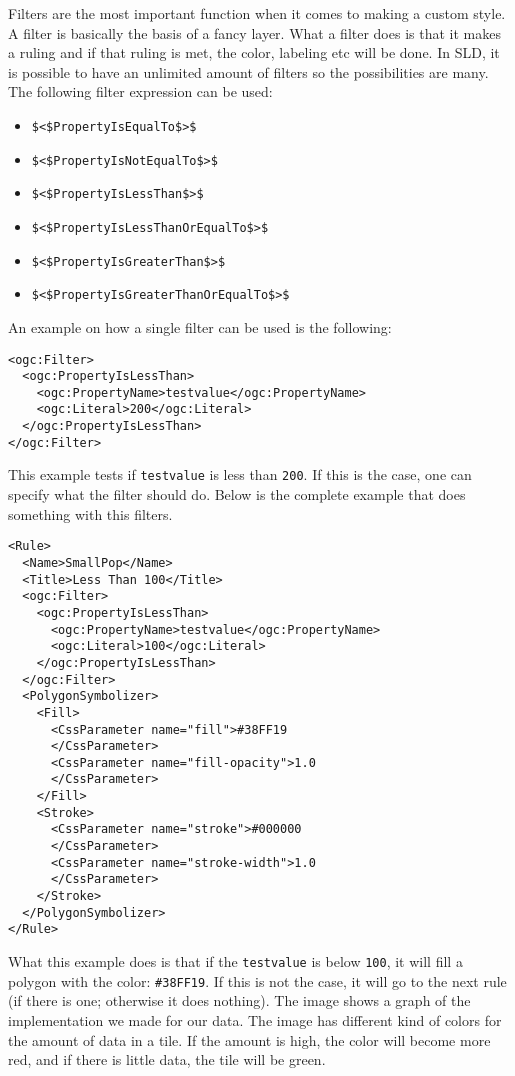 Filters are the most important function when it comes to making a custom
style. A filter is basically the basis of a fancy layer. What a filter does
is that it makes a ruling and if that ruling is met, the color, labeling
etc will be done. In SLD, it is possible to have an unlimited amount of
filters so the possibilities are many. The following filter expression
can be used:

\begin{itemize}
	\item \lstinline|$<$PropertyIsEqualTo$>$|
	\item \lstinline|$<$PropertyIsNotEqualTo$>$|
	\item \lstinline|$<$PropertyIsLessThan$>$|
	\item \lstinline|$<$PropertyIsLessThanOrEqualTo$>$|
	\item \lstinline|$<$PropertyIsGreaterThan$>$|
	\item \lstinline|$<$PropertyIsGreaterThanOrEqualTo$>$|
\end{itemize}
An example on how a single filter can be used is the following:
\begin{lstlisting}
<ogc:Filter>
  <ogc:PropertyIsLessThan>
    <ogc:PropertyName>testvalue</ogc:PropertyName>
    <ogc:Literal>200</ogc:Literal>
  </ogc:PropertyIsLessThan>
</ogc:Filter>
\end{lstlisting}

This example tests if \lstinline|testvalue| is less than \lstinline|200|.
If this is the case, one can specify what the filter should do. Below is
the complete example that does something with this filters.

\begin{lstlisting}
<Rule>
  <Name>SmallPop</Name>
  <Title>Less Than 100</Title>
  <ogc:Filter>
    <ogc:PropertyIsLessThan>
      <ogc:PropertyName>testvalue</ogc:PropertyName>
      <ogc:Literal>100</ogc:Literal>
    </ogc:PropertyIsLessThan>
  </ogc:Filter>
  <PolygonSymbolizer>
    <Fill>
      <CssParameter name="fill">#38FF19
      </CssParameter>
      <CssParameter name="fill-opacity">1.0
      </CssParameter>
    </Fill>
    <Stroke>
      <CssParameter name="stroke">#000000
      </CssParameter>
      <CssParameter name="stroke-width">1.0
      </CssParameter>
    </Stroke>
  </PolygonSymbolizer>
</Rule>
\end{lstlisting}

What this example does is that if the \lstinline|testvalue| is below
\lstinline|100|, it will fill a polygon with the color:
\lstinline|#38FF19|. If this is not the case, it will go to the next rule
(if there is one; otherwise it does nothing). The image shows a graph of
the implementation we made for our data. The image has different kind of
colors for the amount of data in a tile. If the amount is high, the color
will become more red, and if there is little data, the tile will be green.

